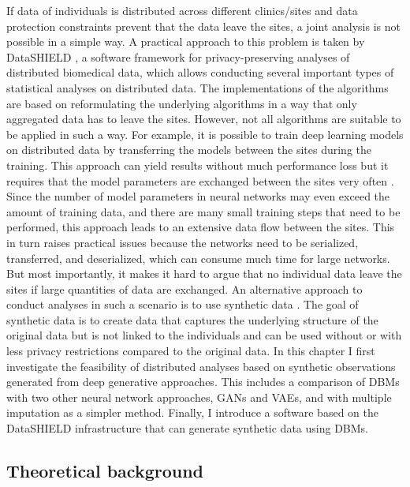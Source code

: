 \documentclass[12pt]{article}
\begin{document}
If data of individuals is distributed across different clinics/sites and data protection constraints prevent that the data leave the sites, a joint analysis is not possible in a simple way. 
A practical approach to this problem is taken by DataSHIELD \citep{budin-ljosne_datashield}, a software framework for privacy-preserving analyses of distributed biomedical data, which allows conducting several important types of statistical analyses on distributed data.
The implementations of the algorithms are based on reformulating the underlying algorithms in a way that only aggregated data has to leave the sites.
However, not all algorithms are suitable to be applied in such a way.
For example, it is possible to train deep learning models on distributed data by transferring the models between the sites during the training.
This approach can yield results without much  performance loss but it requires that the model parameters are exchanged between the sites very often \citep{chang_distributed}.
Since the number of model parameters in neural networks may even exceed the amount of training data, and there are many small training steps that need to be performed, this approach leads to an extensive data flow between the sites.
This in turn raises practical issues because the networks need to be serialized, transferred, and deserialized, which can consume much time for large networks.
But most importantly, it makes it hard to argue that no individual data leave the sites if large quantities of data are exchanged.
An alternative approach to conduct analyses in such a scenario is to use synthetic data \citep{bonofiglio2020}.
The goal of synthetic data is to create data that captures the underlying structure of the original data but is not linked to the individuals and can be used without or with less privacy restrictions compared to the original data.
In this chapter I first investigate the feasibility of distributed analyses based on synthetic observations generated from deep generative approaches.
This includes a comparison of DBMs with two other neural network approaches, GANs and VAEs, and with multiple imputation as a simpler method.
Finally, I introduce a software based on the DataSHIELD infrastructure that can generate synthetic data using DBMs.

\subsection{Theoretical background}
\end{document}
